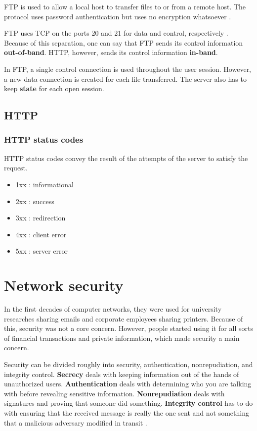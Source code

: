 \documentclass[12pt, oneside]{book}
\begin{document}
FTP is used to allow a local host to transfer files to or from a remote host. The protocol uses password authentication but uses no encryption whatsoever \cite[p.~116]{computer-networking-kurose-2012}.

FTP uses TCP on the ports 20 and 21 for data and control, respectively \cite[p.~117]{computer-networking-kurose-2012}. Because of this separation, one can say that FTP sends its control information \textbf{out-of-band}. HTTP, however, sends its control information \textbf{in-band}.

In FTP, a single control connection is used throughout the user session. However, a new data connection is created for each file transferred. The server also has to keep \textbf{state} for each open session.

\subsection{HTTP}

\subsubsection{HTTP status codes}
HTTP status codes convey the result of the attempts of the server to satisfy the request.

\begin{itemize}
 \item 1xx : informational
 \item 2xx : success
 \item 3xx : redirection
 \item 4xx : client error
 \item 5xx : server error
\end{itemize}

\section{Network security}

In the first decades of computer networks, they were used for university researches sharing emails and corporate employees sharing printers. Because of this, security was not a core concern. However, people started using it for all sorts of financial transactions and private information, which made security a main concern.

Security can be divided roughly into security, authentication, nonrepudiation, and integrity control. \textbf{Secrecy} deals with keeping information out of the hands of unauthorized users. \textbf{Authentication} deals with determining who you are talking with before revealing sensitive information. \textbf{Nonrepudiation} deals with signatures and proving that someone did something. \textbf{Integrity control} has to do with ensuring that the received message is really the one sent and not something that a malicious adversary modified in transit \cite[p.~764]{computer-networks-tanenbaum-2012}.
\end{document}
